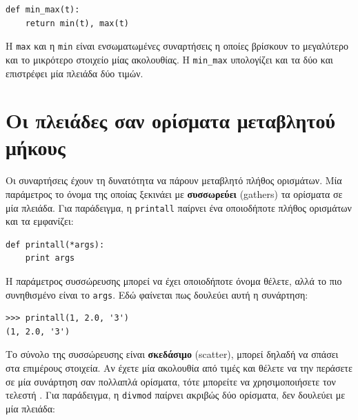\documentclass[10pt]{book}
\begin{document}
\begin{verbatim}
def min_max(t):
    return min(t), max(t)
\end{verbatim}
%
Η {\tt max} και η {\tt min} είναι ενσωματωμένες συναρτήσεις η οποίες βρίσκουν το μεγαλύτερο και το μικρότερο στοιχείο μίας ακολουθίας. Η \verb"min_max" υπολογίζει και τα δύο και επιστρέφει μία πλειάδα δύο τιμών.


 
\section{Οι πλειάδες σαν ορίσματα μεταβλητού μήκους}

Οι συναρτήσεις έχουν τη δυνατότητα να πάρουν μεταβλητό πλήθος ορισμάτων. Μία παράμετρος το όνομα της οποίας ξεκινάει με {\tt *} {\bf συσσωρεύει} (gathers) τα ορίσματα σε μία πλειάδα. Για παράδειγμα, η {\tt printall} παίρνει ένα οποιοδήποτε πλήθος ορισμάτων και τα εμφανίζει:

\begin{verbatim}
def printall(*args):
    print args
\end{verbatim}
%
Η παράμετρος συσσώρευσης μπορεί να έχει οποιοδήποτε όνομα θέλετε, αλλά το πιο συνηθισμένο είναι το {\tt args}. Εδώ φαίνεται πως δουλεύει αυτή η συνάρτηση:

\begin{verbatim}
>>> printall(1, 2.0, '3')
(1, 2.0, '3')
\end{verbatim}
%
Το σύνολο της συσσώρευσης είναι {\bf σκεδάσιμο} (scatter), μπορεί δηλαδή να σπάσει στα επιμέρους στοιχεία. Αν έχετε μία ακολουθία από τιμές και θέλετε να την περάσετε σε μία συνάρτηση σαν πολλαπλά ορίσματα, τότε μπορείτε να χρησιμοποιήσετε τον τελεστή {\tt *}. Για παράδειγμα, η {\tt divmod} παίρνει ακριβώς δύο ορίσματα, δεν δουλεύει με μία πλειάδα:


%
\end{document}
